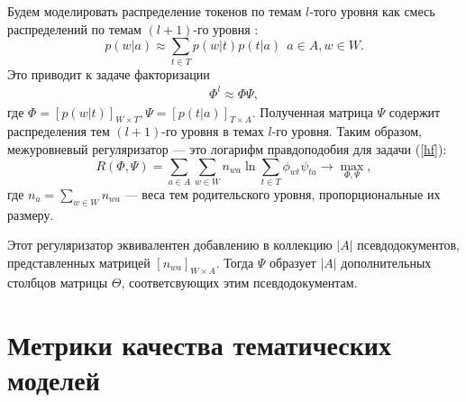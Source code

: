 Будем моделировать распределение токенов по темам $l$-того уровня как смесь распределений по темам $(l+1)$-го уровня \cite{hARTM}:
$$p(w|a) \approx \sum\limits_{t \in T}  p(w|t)p(t|a) \ \ a\in A, w \in W.$$
Это приводит к задаче факторизации
\begin{align}
\Phi^l \approx \Phi \Psi, \tag{**}\label{hf}
\end{align}
где $\Phi = [p(w|t)]_{W \times T}, \Psi=[p(t|a)]_{T \times A}$. Полученная матрица $\Psi$ содержит распределения тем $(l+1)$-го уровня в темах $l$-го уровня. 
Таким образом, межуровневый регуляризатор --- это логарифм правдоподобия для задачи (\ref{hf}): $$R(\Phi, \Psi) = \sum\limits_{a \in A} \sum\limits_{w \in W} n_{wa} \ln{\sum\limits_{t \in T} \phi_{wt}\psi_{ta}}\rightarrow 
\max\limits_{\Phi, \Psi},$$ где $n_{a} = \sum\limits_{w \in W} n_{wa}$ --- веса тем родительского уровня, пропорциональные их размеру.


Этот регуляризатор эквивалентен добавлению в коллекцию $|A|$ псевдодокументов, представленных матрицей $[n_{wa}]_{W\times A}$. Тогда $\Psi$ образует $|A|$ дополнительных столбцов матрицы $\Theta$, соответсвующих этим псевдодокументам.

\section{Метрики качества тематических моделей}
